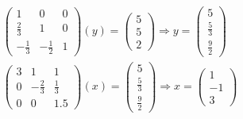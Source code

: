 \documentclass[]{article}
\begin{document}
\[
\begin{array}{l}{\left(\begin{array}{ccc}{1} & {0} & {0} \\ {\frac{2}{3}} & {1} & {0} \\ {-\frac{1}{3}} & {-\frac{1}{2}} & {1}\end{array}\right)(y)=\left(\begin{array}{l}{5} \\ {5} \\ {2}\end{array}\right) \Rightarrow y=\left(\begin{array}{c}{5} \\ {\frac{5}{3}} \\ {\frac{9}{2}}\end{array}\right)} \\ {\left(\begin{array}{ccc}{3} & {1} & {1} \\ {0} & {-\frac{2}{3}} & {\frac{1}{3}} \\ {0} & {0} & {1.5}\end{array}\right)(x)=\left(\begin{array}{c}{5} \\ {\frac{5}{3}} \\ {\frac{9}{2}}\end{array}\right) \Rightarrow x=\left(\begin{array}{c}{1} \\ {-1} \\ {3}\end{array}\right)}\end{array}
\]
\end{document}
